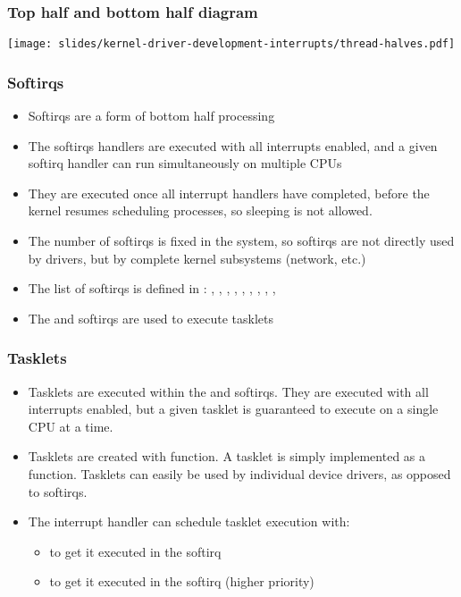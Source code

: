 \begin{frame}
  \frametitle{Top half and bottom half diagram}
  \begin{center}
    \texttt{[image: slides/kernel-driver-development-interrupts/thread-halves.pdf]}
  \end{center}
\end{frame}

\begin{frame}
  \frametitle{Softirqs}
  \begin{itemize}
  \item Softirqs are a form of bottom half processing
  \item The softirqs handlers are executed with all interrupts
    enabled, and a given softirq handler can run simultaneously on
    multiple CPUs
  \item They are executed once all interrupt handlers have completed,
    before the kernel resumes scheduling processes, so sleeping is not
    allowed.
  \item The number of softirqs is fixed in the system, so softirqs are
    not directly used by drivers, but by complete kernel subsystems
    (network, etc.)
  \item The list of softirqs is defined in
    : , ,
    , , , ,
    , , , 
  \item The  and  softirqs are used to execute
    tasklets
  \end{itemize}
\end{frame}

\begin{frame}
  \frametitle{Tasklets}
  \begin{itemize}
  \item Tasklets are executed within the  and 
    softirqs. They are executed with all interrupts enabled, but a
    given tasklet is guaranteed to execute on a single CPU at a time.
  \item Tasklets are created with  function.
    A tasklet is simply implemented as a function. Tasklets can easily
    be used by individual device drivers, as opposed to softirqs.
  \item The interrupt handler can schedule tasklet execution with:
    \begin{itemize}
    \item {} to get it executed in the
       softirq
    \item {} to get it executed in the
       softirq (higher priority)
    \end{itemize}
  \end{itemize}
\end{frame}

